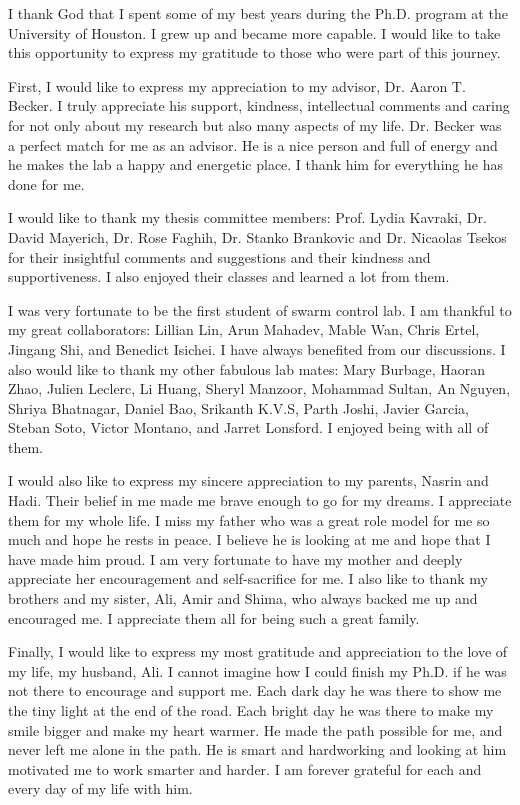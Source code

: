 



I thank God that I spent some of my best years during the Ph.D. program at the University of Houston. I grew up and became more capable. I would like to take this opportunity to express my gratitude to those who were part of this journey.

First, I would like to express my appreciation to my advisor, Dr. Aaron T. Becker. I truly appreciate his support, kindness, intellectual comments and caring for not only about my research but also many aspects of my life. Dr. Becker was a perfect match for me as an advisor. He is a nice person and full of energy and he makes the lab a happy and energetic place. I thank him for everything he has done for me.

I would like to thank my thesis committee members: Prof. Lydia Kavraki, Dr. David Mayerich, Dr. Rose Faghih, Dr. Stanko Brankovic and Dr. Nicaolas Tsekos for their insightful comments and suggestions and their kindness and supportiveness. I also enjoyed their classes and learned a lot from them.

I was very fortunate to be the first student of swarm control lab. I am thankful to my great collaborators: Lillian Lin, Arun Mahadev, Mable Wan, Chris Ertel, Jingang Shi, and Benedict Isichei. I have always benefited from our discussions. I also would like to thank my other fabulous lab mates: Mary Burbage, Haoran Zhao, Julien Leclerc, Li Huang, Sheryl Manzoor, Mohammad Sultan, An Nguyen, Shriya Bhatnagar, Daniel Bao, Srikanth K.V.S, Parth Joshi, Javier Garcia, Steban Soto, Victor Montano, and Jarret Lonsford. I enjoyed being with all of them.

I would also like to express my sincere appreciation to my parents, Nasrin and Hadi. Their belief in me made me brave enough to go for my dreams. I appreciate them for my whole life. I miss my father who was a great role model for me so much and hope he rests in peace. I believe he is looking at me and hope that I have made him proud. I am very fortunate to have my mother and deeply appreciate her encouragement and self-sacrifice for me. I also like to thank my brothers and my sister, Ali, Amir and Shima, who always backed me up and encouraged me. I appreciate them all for being such a great family.

Finally, I would like to express my most gratitude and appreciation to the love of my life, my husband, Ali. I cannot imagine how I could finish my Ph.D. if he was not there to encourage and support me. Each dark day he was there to show me the tiny light at the end of the road. Each bright day he was there to make my smile bigger and make my heart warmer. He made the path possible for me, and never left me alone in the path. He is smart and hardworking and looking at him motivated me to work smarter and harder. I am forever grateful for each and every day of my life with him.


